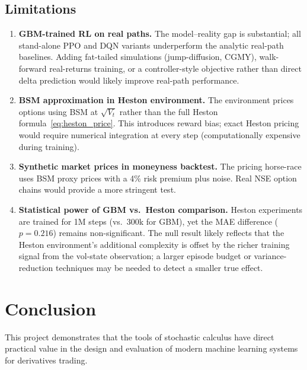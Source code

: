 \documentclass[12pt,a4paper]{article}
\begin{document}
\subsection{Limitations}

\begin{enumerate}[leftmargin=*]
  \item \textbf{GBM-trained RL on real paths.}  The model--reality gap is
        substantial; all stand-alone PPO and DQN variants underperform the
        analytic real-path baselines.  Adding fat-tailed simulations
        (jump-diffusion, CGMY), walk-forward real-returns training, or a
        controller-style objective rather than direct delta prediction would
        likely improve real-path performance.

  \item \textbf{BSM approximation in Heston environment.}  The environment
        prices options using BSM at $\sqrt{V_t}$ rather than the full Heston
        formula~\eqref{eq:heston_price}.  This introduces reward bias;
        exact Heston pricing would require numerical integration at every step
        (computationally expensive during training).

  \item \textbf{Synthetic market prices in moneyness backtest.}  The pricing
        horse-race uses BSM proxy prices with a 4\% risk premium plus noise.
        Real NSE option chains would provide a more stringent test.

  \item \textbf{Statistical power of GBM vs.\ Heston comparison.}  Heston
        experiments are trained for 1M steps (vs.\ 300k for GBM), yet the
        MAE difference ($p=0.216$) remains non-significant.  The null result
        likely reflects that the Heston environment's additional complexity is
        offset by the richer training signal from the vol-state observation;
        a larger episode budget or variance-reduction techniques may be needed
        to detect a smaller true effect.
\end{enumerate}

\section{Conclusion}
\label{sec:conclusion}

This project demonstrates that the tools of stochastic calculus have direct
practical value in the design and evaluation of modern machine learning systems
for derivatives trading.
\end{document}
